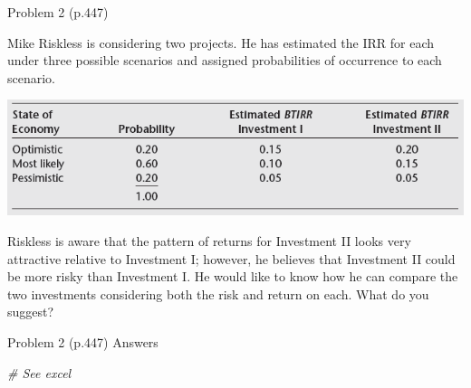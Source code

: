 \documentclass[ignorenonframetext,]{beamer}
\newenvironment{Shaded}{\begin{snugshade}}{\end{snugshade}}
\newcommand{\CommentTok}[1]{\textcolor[rgb]{0.56,0.35,0.01}{\textit{{#1}}}}
\begin{document}
\begin{frame}{Problem 2 (p.447)}

\small

Mike Riskless is considering two projects. He has estimated the IRR for
each under three possible scenarios and assigned probabilities of
occurrence to each scenario.

\begin{center}\includegraphics[width=300 px]{p2_447} \end{center}

Riskless is aware that the pattern of returns for Investment II looks
very attractive relative to Investment I; however, he believes that
Investment II could be more risky than Investment I. He would like to
know how he can compare the two investments considering both the risk
and return on each. What do you suggest?

\end{frame}

\begin{frame}[fragile]{Problem 2 (p.447) Answers}

\begin{Shaded}
\begin{Highlighting}[]
\CommentTok{# See excel}
\end{Highlighting}
\end{Shaded}

\end{frame}
\end{document}
